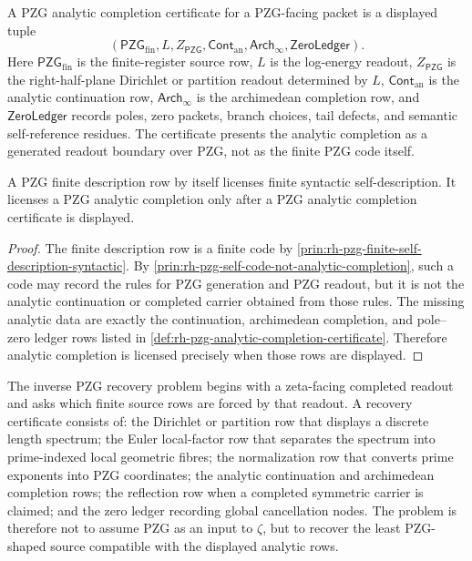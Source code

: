 \begin{definition}
\label{def:rh-pzg-analytic-completion-certificate}
A PZG analytic completion certificate for a PZG-facing packet is a displayed
tuple
$$
(\mathsf{PZG}_{\mathrm{fin}},L,Z_{\mathsf{PZG}},
\mathsf{Cont}_{\mathrm{an}},\mathsf{Arch}_{\infty},\mathsf{ZeroLedger}).
$$
Here $\mathsf{PZG}_{\mathrm{fin}}$ is the finite-register source row, $L$ is
the log-energy readout, $Z_{\mathsf{PZG}}$ is the right-half-plane Dirichlet
or partition readout determined by $L$, $\mathsf{Cont}_{\mathrm{an}}$ is the
analytic continuation row, $\mathsf{Arch}_{\infty}$ is the archimedean
completion row, and $\mathsf{ZeroLedger}$ records poles, zero packets,
branch choices, tail defects, and semantic self-reference residues.  The
certificate presents the analytic completion as a generated readout boundary
over PZG, not as the finite PZG code itself.
\end{definition}

\begin{theorem}
\label{thm:rh-pzg-self-readout-completion-requires-certificate}
A PZG finite description row by itself licenses finite syntactic
self-description.  It licenses a PZG analytic completion only after a PZG
analytic completion certificate is displayed.
\end{theorem}

\begin{proof}
The finite description row is a finite code by
\autoref{prin:rh-pzg-finite-self-description-syntactic}.  By
\autoref{prin:rh-pzg-self-code-not-analytic-completion}, such a code may
record the rules for PZG generation and PZG readout, but it is not the
analytic continuation or completed carrier obtained from those rules.  The
missing analytic data are exactly the continuation, archimedean completion,
and pole--zero ledger rows listed in
\autoref{def:rh-pzg-analytic-completion-certificate}.  Therefore analytic
completion is licensed precisely when those rows are displayed.
\end{proof}

\begin{definition}
\label{def:rh-pzg-inverse-recovery-problem}
The inverse PZG recovery problem begins with a zeta-facing completed readout
and asks which finite source rows are forced by that readout.  A recovery
certificate consists of:
the Dirichlet or partition row that displays a discrete length spectrum; the
Euler local-factor row that separates the spectrum into prime-indexed local
geometric fibres; the normalization row that converts prime exponents into
PZG coordinates; the analytic continuation and archimedean completion rows;
the reflection row when a completed symmetric carrier is claimed; and the
zero ledger recording global cancellation nodes.  The problem is therefore
not to assume PZG as an input to $\zeta$, but to recover the least PZG-shaped
source compatible with the displayed analytic rows.
\end{definition}

